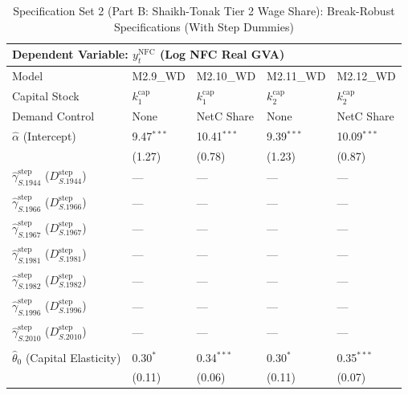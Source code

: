 \begin{table}[H]
\centering
\caption{Specification Set 2 (Part B: Shaikh-Tonak Tier 2 Wage Share): Break-Robust Specifications (With Step Dummies)}
\label{tab:spec_set_2_b_wd}
\scriptsize
\begin{tabular}{p{3.8cm}p{1.35cm}p{1.35cm}p{1.35cm}p{1.35cm}}
\toprule
\multicolumn{5}{l}{\textbf{Dependent Variable: $y_t^{\text{NFC}}$ (Log NFC Real GVA)}} \\
\midrule
Model & M2.9\_WD & M2.10\_WD & M2.11\_WD & M2.12\_WD  \\
Capital Stock & $k^{\text{cap}}_1$ & $k^{\text{cap}}_1$ & $k^{\text{cap}}_2$ & $k^{\text{cap}}_2$  \\
Demand Control & None & NetC Share & None & NetC Share  \\
\midrule
$\hat{\alpha}$ (Intercept)  & 9.47$^{***}$ & 10.41$^{***}$ & 9.39$^{***}$ & 10.09$^{***}$  \\
 & {\scriptsize (1.27)} & {\scriptsize (0.78)} & {\scriptsize (1.23)} & {\scriptsize (0.87)}  \\
$\hat{\gamma}^{\text{step}}_{S.1944}$ ($D^{\text{step}}_{S.1944}$)  & --- & --- & --- & ---  \\
 &  &  &  &   \\
$\hat{\gamma}^{\text{step}}_{S.1966}$ ($D^{\text{step}}_{S.1966}$)  & --- & --- & --- & ---  \\
 &  &  &  &   \\
$\hat{\gamma}^{\text{step}}_{S.1967}$ ($D^{\text{step}}_{S.1967}$)  & --- & --- & --- & ---  \\
 &  &  &  &   \\
$\hat{\gamma}^{\text{step}}_{S.1981}$ ($D^{\text{step}}_{S.1981}$)  & --- & --- & --- & ---  \\
 &  &  &  &   \\
$\hat{\gamma}^{\text{step}}_{S.1982}$ ($D^{\text{step}}_{S.1982}$)  & --- & --- & --- & ---  \\
 &  &  &  &   \\
$\hat{\gamma}^{\text{step}}_{S.1996}$ ($D^{\text{step}}_{S.1996}$)  & --- & --- & --- & ---  \\
 &  &  &  &   \\
$\hat{\gamma}^{\text{step}}_{S.2010}$ ($D^{\text{step}}_{S.2010}$)  & --- & --- & --- & ---  \\
 &  &  &  &   \\
[1ex]
$\hat{\theta}_0$ (Capital Elasticity)  & 0.30$^{*}$ & 0.34$^{***}$ & 0.30$^{*}$ & 0.35$^{***}$  \\
 & {\scriptsize (0.11)} & {\scriptsize (0.06)} & {\scriptsize (0.11)} & {\scriptsize (0.07)}  \\

\end{tabular}
\end{table}
